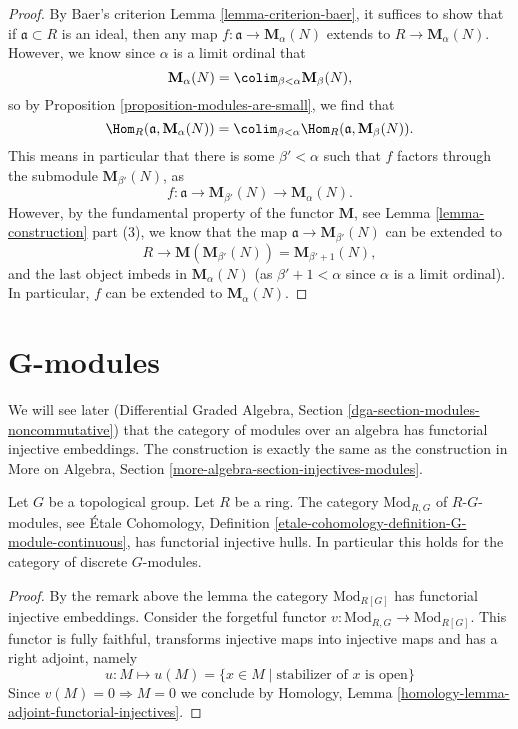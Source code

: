 \begin{proof}
By Baer's criterion
Lemma \ref{lemma-criterion-baer},
it suffices to show that if $\mathfrak{a} \subset R$ is an ideal, then
any map $f : \mathfrak{a} \to \mathbf{M}_\alpha(N)$ extends to
$R \to \mathbf{M}_\alpha(N)$. However, we know since $\alpha$ is a limit
ordinal that
$$
\mathbf{M}_{\alpha}(N) =
\colim_{\beta < \alpha} \mathbf{M}_{\beta}(N),
$$
so by
Proposition \ref{proposition-modules-are-small},
we find that
$$
\Hom_R(\mathfrak{a}, \mathbf{M}_{\alpha}(N)) =
\colim_{\beta < \alpha} \Hom_R(\mathfrak a, \mathbf{M}_{\beta}(N)).
$$
This means in particular that there is some $\beta' < \alpha$
such that $f$ factors through the submodule $\mathbf{M}_{\beta'}(N)$, as
$$
f : \mathfrak{a} \to \mathbf{M}_{\beta'}(N) \to
\mathbf{M}_{\alpha}(N).
$$
However, by the fundamental property of the functor $\mathbf{M}$,
see Lemma \ref{lemma-construction} part (3),
we know that the map $\mathfrak{a} \to \mathbf{M}_{\beta'}(N)$
can be extended to
$$
R \to \mathbf{M}( \mathbf{M}_{\beta'}(N)) =
\mathbf{M}_{\beta' + 1}(N),
$$
and the last object imbeds in $\mathbf{M}_{\alpha}(N)$ (as
$\beta' + 1 < \alpha$ since $\alpha$ is a limit ordinal).
In particular, $f$ can be extended to $\mathbf{M}_{\alpha}(N)$.
\end{proof}




\section{G-modules}
\label{section-G-modules}

\noindent
We will see later
(Differential Graded Algebra, Section \ref{dga-section-modules-noncommutative})
that the category of modules over an algebra has
functorial injective embeddings. The construction is exactly the same
as the construction in
More on Algebra, Section \ref{more-algebra-section-injectives-modules}.

\begin{lemma}
\label{lemma-G-modules}
Let $G$ be a topological group. Let $R$ be a ring.
The category $\text{Mod}_{R, G}$ of $R\text{-}G$-modules, see
\'Etale Cohomology, Definition
\ref{etale-cohomology-definition-G-module-continuous},
has functorial injective hulls. In particular this holds
for the category of discrete $G$-modules.
\end{lemma}

\begin{proof}
By the remark above the lemma the category $\text{Mod}_{R[G]}$
has functorial injective embeddings.
Consider the forgetful functor
$v : \text{Mod}_{R, G} \to \text{Mod}_{R[G]}$.
This functor is fully faithful, transforms injective maps into
injective maps and has a right adjoint, namely
$$
u : M \mapsto u(M) = \{x \in M \mid \text{stabilizer of }x\text{ is open}\}
$$
Since $v(M) = 0 \Rightarrow M = 0$ we conclude by
Homology, Lemma \ref{homology-lemma-adjoint-functorial-injectives}.
\end{proof}



